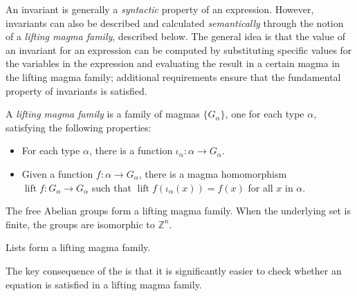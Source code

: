 An invariant is generally a \emph{syntactic} property of an expression. However, invariants can also be described and calculated \emph{semantically} through the notion of a \emph{lifting magma family}, described below. The general idea is that the value of an invariant for an expression can be computed by substituting specific values for the variables in the expression and evaluating the result in a certain magma in the lifting magma family; additional requirements ensure that the fundamental property of invariants is satisfied.

\begin{definition}\label{lifting-magma-family}
	A \emph{lifting magma family} is a family of magmas $\{G_\alpha\}$, one for each type $\alpha$, satisfying the following properties:
	\begin{itemize}
		\item For each type $\alpha$, there is a function $\iota_\alpha : \alpha \to G_\alpha$.
		\item Given a function $f : \alpha \to G_\alpha$, there is a magma homomorphism $\operatorname{lift}{f} : G_\alpha \to G_\alpha$ such that $\operatorname{lift}{f}(\iota_\alpha(x)) = f(x)$ for all $x$ in $\alpha$.
	\end{itemize}
\end{definition}

\begin{example}
	The free Abelian groups form a lifting magma family. When the underlying set is finite, the groups are isomorphic to $\mathbb{Z}^n$.
\end{example}

\begin{example}
	Lists form a lifting magma family.
\end{example}

The key consequence of the  is that it is significantly easier to check whether an equation is satisfied in a lifting magma family.

